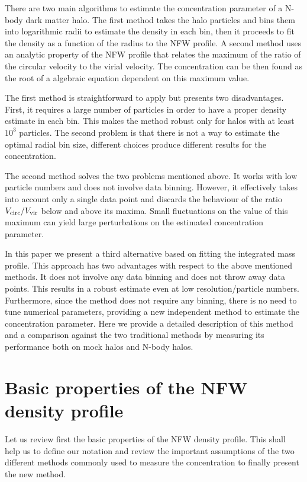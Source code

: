 \documentclass[a4,useAMS,usenatbib,usegraphicx]{mn2e}
\begin{document}
There are two main algorithms to estimate the concentration parameter
of a N-body dark matter halo. 
The first method takes the halo particles and bins them into
logarithmic radii to estimate the density in each bin, then it 
proceeds to fit the density as a function of the radius to the NFW
profile.  
A second method uses an analytic property of the NFW profile
that relates the maximum of the ratio of the circular velocity to the
virial velocity.  The concentration can be then found as the root of a
algebraic equation dependent on this maximum value.

The first method is straightforward to apply but presents two
disadvantages.  
First, it requires a large number of particles in
order to have a proper density estimate in each bin.  
This makes the method robust only for halos with at least $10^3$ particles.  
The second problem is that there is not a way to estimate the optimal
radial bin size, different choices produce different results for the
concentration.

The second method solves the two problems mentioned above.  
It works with low particle numbers and does not involve data binning.  
However, it effectively takes into account only a single data point and
discards the behaviour of the ratio $V_{\rm circ}/V_{\rm vir}$ below
and above its maxima.  
Small fluctuations on the value of this maximum can yield large
perturbations on the estimated concentration parameter.  

In this paper we present a third alternative based on fitting the
integrated mass profile.
This approach has two advantages with respect to the above mentioned
methods.  
It does not involve any data binning and does not throw away data
points. 
This results in a robust estimate even at low resolution/particle
numbers.   
Furthermore, since the method does not require any binning, there is
no need to tune numerical parameters, providing a new independent
method to estimate the concentration parameter. 
Here we provide a detailed description of this method and a
comparison against the two traditional methods by measuring its
performance both on mock halos and N-body halos.





\section{Basic properties of the NFW density profile}
\label{sec:basics}

Let us review first the basic properties of the NFW density profile.
This shall help us to define our notation and review the important
assumptions of the two different methods commonly used to measure the
concentration to finally present the new method.
\end{document}
